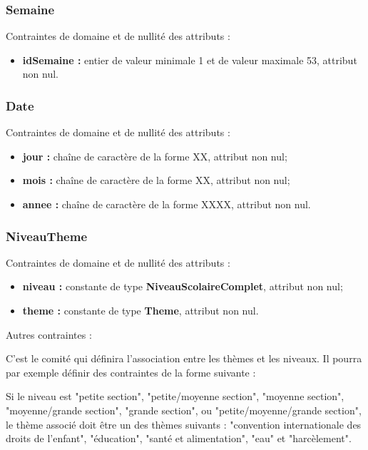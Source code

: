 \subsubsection*{Semaine}
Contraintes de domaine et de nullité des attributs : 
\begin{itemize}
	\item \textbf{idSemaine :} entier de valeur minimale 1 et de valeur maximale 53, attribut non nul.
\end{itemize}

\subsubsection*{Date}
Contraintes de domaine et de nullité des attributs :
\begin{itemize}
	\item \textbf{jour :} chaîne de caractère de la forme XX, attribut non nul;
	\item \textbf{mois :} chaîne de caractère de la forme XX, attribut non nul;  
	\item \textbf{annee :} chaîne de caractère de la forme XXXX, attribut non nul. 
\end{itemize}

\subsubsection*{NiveauTheme}
Contraintes de domaine et de nullité des attributs :
\begin{itemize}
	\item \textbf{niveau :} constante de type \textbf{NiveauScolaireComplet}, attribut non nul;
	\item \textbf{theme :} constante de type \textbf{Theme}, attribut non nul.\\
\end{itemize}

Autres contraintes :

C'est le comité qui définira l'association entre les thèmes et les niveaux. Il pourra par exemple définir des contraintes de la forme suivante :

Si le niveau est "petite section", "petite/moyenne section", "moyenne section", "moyenne/grande section", "grande section", ou "petite/moyenne/grande section", le thème associé doit être un des thèmes suivants : "convention internationale des droits de l'enfant", "éducation", "santé et alimentation", "eau" et "harcèlement". \\


